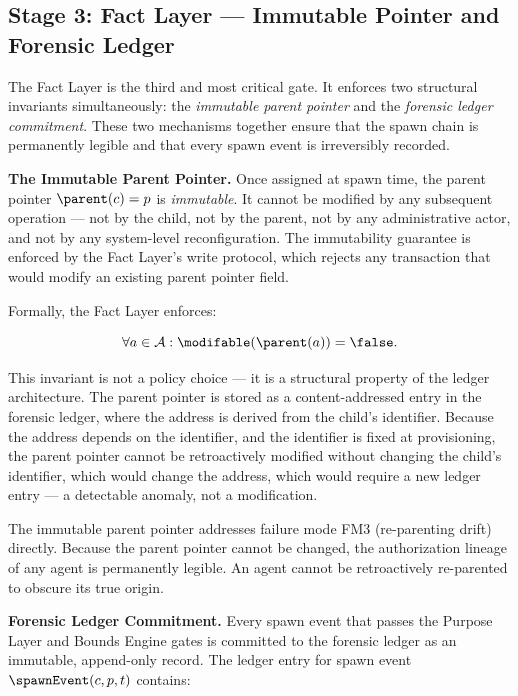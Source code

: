 \subsection{Stage 3: Fact Layer — Immutable Pointer and Forensic Ledger}
\label{sec:rs-protocol-fact-layer}

The Fact Layer is the third and most critical gate. It enforces two structural invariants simultaneously: the \emph{immutable parent pointer} and the \emph{forensic ledger commitment}. These two mechanisms together ensure that the spawn chain is permanently legible and that every spawn event is irreversibly recorded.

\bigskip
\noindent\textbf{The Immutable Parent Pointer.}
Once assigned at spawn time, the parent pointer $\parent(c) = p$ is \emph{immutable}. It cannot be modified by any subsequent operation — not by the child, not by the parent, not by any administrative actor, and not by any system-level reconfiguration. The immutability guarantee is enforced by the Fact Layer's write protocol, which rejects any transaction that would modify an existing parent pointer field.

Formally, the Fact Layer enforces:

\begin{equation}
\forall a \in \mathcal{A}: \modifable(\parent(a)) = \false.
\label{eq:immutable-parent-pointer}
\end{equation}

This invariant is not a policy choice — it is a structural property of the ledger architecture. The parent pointer is stored as a content-addressed entry in the forensic ledger, where the address is derived from the child's identifier. Because the address depends on the identifier, and the identifier is fixed at provisioning, the parent pointer cannot be retroactively modified without changing the child's identifier, which would change the address, which would require a new ledger entry — a detectable anomaly, not a modification.

The immutable parent pointer addresses failure mode FM3 (re-parenting drift) directly. Because the parent pointer cannot be changed, the authorization lineage of any agent is permanently legible. An agent cannot be retroactively re-parented to obscure its true origin.

\bigskip
\noindent\textbf{Forensic Ledger Commitment.}
Every spawn event that passes the Purpose Layer and Bounds Engine gates is committed to the forensic ledger as an immutable, append-only record. The ledger entry for spawn event $\spawnEvent(c, p, t)$ contains:

